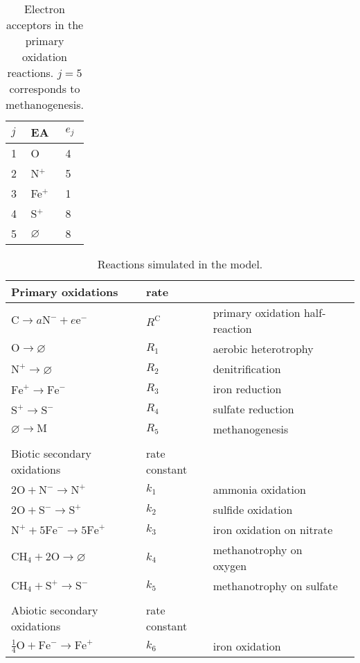 \documentclass{report}
\newcommand{\m}[1]{ \mathrm{#1} }
\begin{document}
\begin{table}
\centering
\begin{tabular}{ l l l }
\toprule
$j$ &   EA   &   $e_j$   \\
\midrule
1   &   O   & 4  \\
2   &   N$^+$   & 5  \\
3   &   Fe$^+$  & 1  \\
4   &   S$^+$   & 8  \\
5   &   $\varnothing$   & 8  \\
\bottomrule
\end{tabular}
\caption{Electron acceptors in the primary oxidation reactions. $j=5$ corresponds to
methanogenesis.}
\label{tab:electron_acceptors}
\end{table}

\begin{table}
\begin{tabular}{ l l l l }
\toprule
Primary oxidations  & rate \\
\midrule
$\m{C} \rightarrow a \m{N}^- + e \m{e}^-$   & $R^\m{C}$ & primary oxidation half-reaction \\
$\m{O} \to \varnothing$    &   $R_1$   & aerobic heterotrophy \\
$\m{N}^+ \to \varnothing$    &   $R_2$   & denitrification \\
$\m{Fe}^+ \to \m{Fe}^-$ & $R_3$ & iron reduction  \\
$\m{S}^+ \to \m{S}^-$ & $R_4$ & sulfate reduction  \\
$\varnothing \to \m{M}$ & $R_5$ & methanogenesis \\
\\
\midrule
Biotic secondary oxidations & rate constant \\
\midrule
$2 \m{O} + \m{N}^- \rightarrow \m{N}^+$  & $k_1$ & ammonia oxidation   \\
$2 \m{O} + \m{S}^- \rightarrow \m{S}^+$  & $k_2$ & sulfide oxidation   \\
$\m{N}^+ + 5 \m{Fe}^- \rightarrow 5 \m{Fe}^+$    &   $k_3$  & iron oxidation on nitrate  \\
$\m{CH}_4 + 2 \m{O} \rightarrow \varnothing$    &   $k_4$  & methanotrophy on oxygen  \\
$\m{CH}_4 + \m{S}^+ \rightarrow \m{S}^-$    &   $k_5$  & methanotrophy on sulfate  \\
\\
\midrule
Abiotic secondary oxidations    & rate constant \\
\midrule
$\tfrac{1}{4} \m{O} + \m{Fe}^- \rightarrow \m{Fe}^+$ & $k_6$ & iron oxidation  \\
\bottomrule
\end{tabular}
\label{tab:reactions}
\caption{Reactions simulated in the model.}
\end{table}
\end{document}
